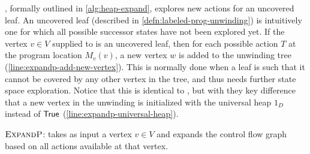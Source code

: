 \expandp, formally outlined in \autoref{alg:heap-expand}, explores new actions for an
uncovered leaf. An uncovered leaf (described in \autoref{defn:labeled-prog-unwinding}) is
intuitively one for which all possible successor states have not been explored yet. If the
vertex $v \in V$ supplied to \expandp is an uncovered leaf, then for each possible action
$T$ at the program location $M_v(v)$, a new vertex $w$ is added to the unwinding tree
(\autoref{line:expandp-add-new-vertex}). This is normally done when a leaf is such that it
cannot be covered by any other vertex in the tree, and thus needs further state space
exploration. Notice that this is identical to \impact, but with they key difference that a
new vertex in the unwinding is initialized with the universal heap $1_D$ instead of
$\mathsf{True}$ (\autoref{line:expandp-universal-heap}).

\begin{algorithm}[ht]


  \caption{$\textsc{ExpandP}$: takes as input a vertex $v \in V$ and expands the control flow graph based on all actions available at that vertex.}
  \label{alg:heap-expand}
\end{algorithm}

